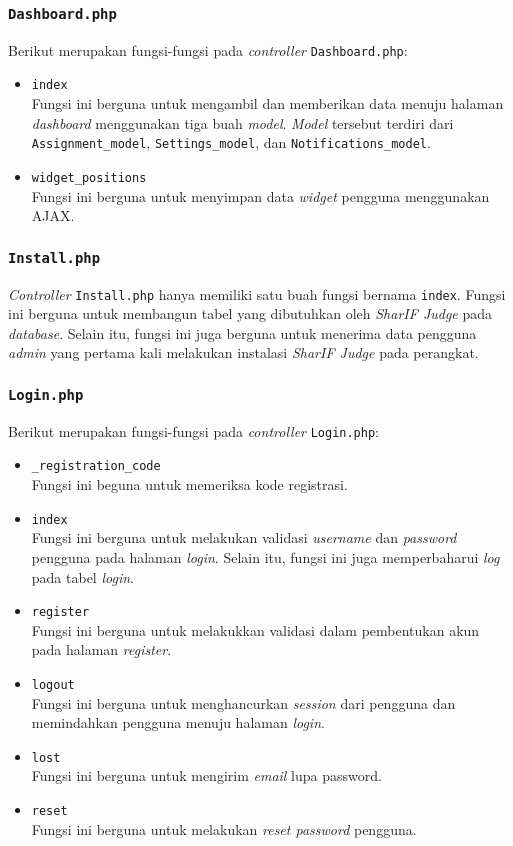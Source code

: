 \subsubsection{\texttt{Dashboard.php}}
Berikut merupakan fungsi-fungsi pada \textit{controller} \texttt{Dashboard.php}:
\begin{itemize}
	\item \texttt{index}\\
	Fungsi ini berguna untuk mengambil dan memberikan data menuju halaman \textit{dashboard} menggunakan tiga buah \textit{model}. \textit{Model} tersebut terdiri dari \texttt{Assignment\_model}, \texttt{Settings\_model}, dan \texttt{Notifications\_model}.
	\item \texttt{widget\_positions}\\
	Fungsi ini berguna untuk menyimpan data \textit{widget} pengguna menggunakan AJAX.
\end{itemize}
\subsubsection{\texttt{Install.php}}
\textit{Controller} \texttt{Install.php} hanya memiliki satu buah fungsi bernama \texttt{index}. Fungsi ini berguna untuk membangun tabel yang dibutuhkan oleh \textit{SharIF Judge} pada \textit{database}. Selain itu, fungsi ini juga berguna untuk menerima data pengguna \textit{admin} yang pertama kali melakukan instalasi \textit{SharIF Judge} pada perangkat.

\subsubsection{\texttt{Login.php}}
Berikut merupakan fungsi-fungsi pada \textit{controller} \texttt{Login.php}:
\begin{itemize}
	\item \texttt{\_registration\_code}\\
	Fungsi ini beguna untuk memeriksa kode registrasi.
	\item \texttt{index}\\
	Fungsi ini berguna untuk melakukan validasi \textit{username} dan \textit{password} pengguna pada halaman \textit{login}. Selain itu, fungsi ini juga memperbaharui \textit{log} pada tabel \textit{login}.
	\item \texttt{register}\\
	Fungsi ini berguna untuk melakukkan validasi dalam pembentukan akun pada halaman \textit{register}.
	\item \texttt{logout}\\
	Fungsi ini berguna untuk menghancurkan \textit{session} dari pengguna dan memindahkan pengguna menuju halaman \textit{login}.
	\item \texttt{lost}\\
	Fungsi ini berguna untuk mengirim \textit{email} lupa password.
	\item \texttt{reset}\\
	Fungsi ini berguna untuk melakukan \textit{reset password} pengguna.
\end{itemize}

